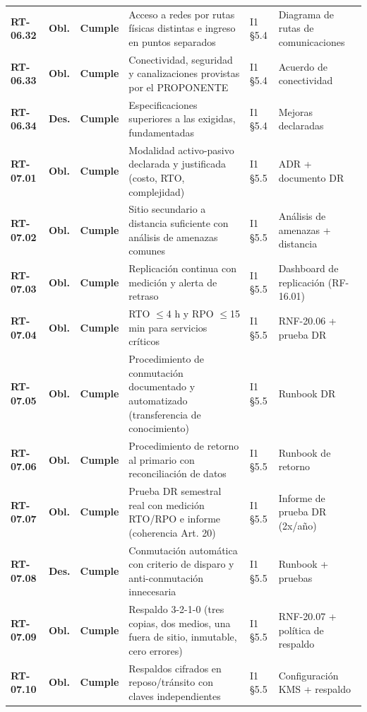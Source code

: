 \begin{small}
\begin{longtable}{@{}p{1.35cm} p{1.15cm} p{1.15cm} p{4.6cm} p{2.35cm} p{3.8cm}@{}}
\textbf{RT-06.32} & \textbf{Obl.} & \textbf{Cumple} & Acceso a redes por rutas f\'isicas distintas e ingreso en puntos separados & I1 §5.4 & Diagrama de rutas de comunicaciones \\
\textbf{RT-06.33} & \textbf{Obl.} & \textbf{Cumple} & Conectividad, seguridad y canalizaciones provistas por el PROPONENTE & I1 §5.4 & Acuerdo de conectividad \\
\textbf{RT-06.34} & \textbf{Des.} & \textbf{Cumple} & Especificaciones superiores a las exigidas, fundamentadas & I1 §5.4 & Mejoras declaradas \\
\textbf{RT-07.01} & \textbf{Obl.} & \textbf{Cumple} & Modalidad activo-pasivo declarada y justificada (costo, RTO, complejidad) & I1 §5.5 & ADR + documento DR \\
\textbf{RT-07.02} & \textbf{Obl.} & \textbf{Cumple} & Sitio secundario a distancia suficiente con an\'alisis de amenazas comunes & I1 §5.5 & An\'alisis de amenazas + distancia \\
\textbf{RT-07.03} & \textbf{Obl.} & \textbf{Cumple} & Replicaci\'on continua con medici\'on y alerta de retraso & I1 §5.5 & Dashboard de replicaci\'on (RF-16.01) \\
\textbf{RT-07.04} & \textbf{Obl.} & \textbf{Cumple} & RTO $\leq$4 h y RPO $\leq$15 min para servicios cr\'iticos & I1 §5.5 & RNF-20.06 + prueba DR \\
\textbf{RT-07.05} & \textbf{Obl.} & \textbf{Cumple} & Procedimiento de conmutaci\'on documentado y automatizado (transferencia de conocimiento) & I1 §5.5 & Runbook DR \\
\textbf{RT-07.06} & \textbf{Obl.} & \textbf{Cumple} & Procedimiento de retorno al primario con reconciliaci\'on de datos & I1 §5.5 & Runbook de retorno \\
\textbf{RT-07.07} & \textbf{Obl.} & \textbf{Cumple} & Prueba DR semestral real con medici\'on RTO/RPO e informe (coherencia Art. 20) & I1 §5.5 & Informe de prueba DR (2x/a\~no) \\
\textbf{RT-07.08} & \textbf{Des.} & \textbf{Cumple} & Conmutaci\'on autom\'atica con criterio de disparo y anti-conmutaci\'on innecesaria & I1 §5.5 & Runbook + pruebas \\
\textbf{RT-07.09} & \textbf{Obl.} & \textbf{Cumple} & Respaldo 3-2-1-0 (tres copias, dos medios, una fuera de sitio, inmutable, cero errores) & I1 §5.5 & RNF-20.07 + pol\'itica de respaldo \\
\textbf{RT-07.10} & \textbf{Obl.} & \textbf{Cumple} & Respaldos cifrados en reposo/tr\'ansito con claves independientes & I1 §5.5 & Configuraci\'on KMS + respaldo \\

\end{longtable}
\end{small}
